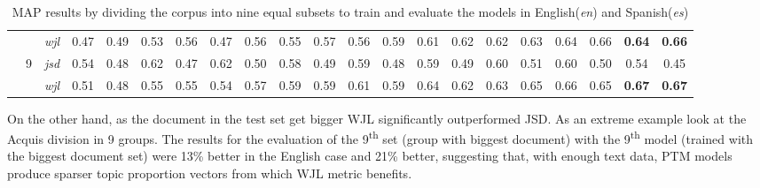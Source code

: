 \begin{table}[ht]
{{\begin{tabular}{ccccccccccccccccccccc}
\multicolumn{1}{c|}{} &  & \multicolumn{1}{c|}{\textit{wjl}} & 0.47 & \multicolumn{1}{c|}{0.49} & 0.53 & \multicolumn{1}{c|}{0.56} & 0.47 & \multicolumn{1}{c|}{0.56} & 0.55 & \multicolumn{1}{c|}{0.57} & 0.56 & \multicolumn{1}{c|}{0.59} & 0.61 & \multicolumn{1}{c|}{0.62} & 0.62 & \multicolumn{1}{c|}{0.63} & \cellcolor{gray!25}0.64 & \multicolumn{1}{c|}{\cellcolor{gray!25}0.66} & \textbf{0.64} & \multicolumn{1}{c|}{\textbf{0.66}} \\ \cline{2-21} 
\multicolumn{1}{c|}{} & \multirow{2}{*}{9} & \multicolumn{1}{c|}{\textit{jsd}} & 0.54 & \multicolumn{1}{c|}{0.48} & 0.62 & \multicolumn{1}{c|}{0.47} & 0.62 & \multicolumn{1}{c|}{0.50} & 0.58 & \multicolumn{1}{c|}{0.49} & 0.59 & \multicolumn{1}{c|}{0.48} & 0.59 & \multicolumn{1}{c|}{0.49} & 0.60 & \multicolumn{1}{c|}{0.51} & 0.60 & \multicolumn{1}{c|}{0.50} & \cellcolor{gray!25}0.54 & \multicolumn{1}{c|}{\cellcolor{gray!25}0.45} \\
\multicolumn{1}{c|}{} &  & \multicolumn{1}{c|}{\textit{wjl}} & 0.51 & \multicolumn{1}{c|}{0.48} & 0.55 & \multicolumn{1}{c|}{0.55} & 0.54 & \multicolumn{1}{c|}{0.57} & 0.59 & \multicolumn{1}{c|}{0.59} & 0.61 & \multicolumn{1}{c|}{0.59} & 0.64 & \multicolumn{1}{c|}{0.62} & 0.63 & \multicolumn{1}{c|}{0.65} & 0.66 & \multicolumn{1}{c|}{0.65} & \cellcolor{gray!25}\textbf{0.67} & \multicolumn{1}{c|}{\cellcolor{gray!25}\textbf{0.67}} \\ \cline{2-21} 
\end{tabular}
}
}
 \vspace*{3mm}
 \caption{MAP results by dividing the corpus into nine equal subsets to train and evaluate the models in English(\textit{en}) and Spanish(\textit{es})}
 \label{table:acquis9}
\end{table}

On the other hand, as the document in the test set get bigger WJL significantly outperformed JSD. As an extreme example look at the Acquis division in 9 groups. The results for the evaluation of the 9\textsuperscript{th} set (group with biggest document) with the 9\textsuperscript{th} model (trained with the biggest document set) were 13\% better in the English case and 21\% better, suggesting that, with enough text data, PTM models produce sparser topic proportion vectors from which WJL metric benefits. 


